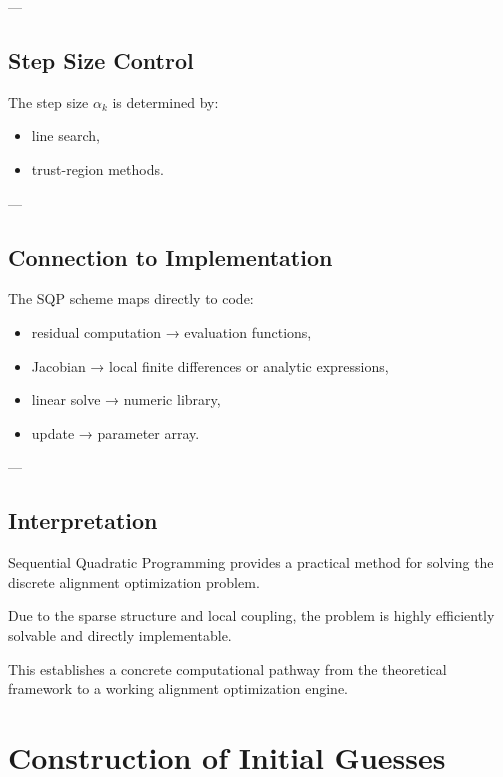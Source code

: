 ---

\subsection{Step Size Control}

\begin{remark}
The step size \(\alpha_k\) is determined by:
\begin{itemize}
\item line search,
\item trust-region methods.
\end{itemize}
\end{remark}

---

\subsection{Connection to Implementation}

\begin{remark}
The SQP scheme maps directly to code:
\begin{itemize}
\item residual computation → evaluation functions,
\item Jacobian → local finite differences or analytic expressions,
\item linear solve → numeric library,
\item update → parameter array.
\end{itemize}
\end{remark}

---

\subsection{Interpretation}

\begin{summary}
Sequential Quadratic Programming provides a practical method for solving
the discrete alignment optimization problem.

Due to the sparse structure and local coupling, the problem is highly
efficiently solvable and directly implementable.

This establishes a concrete computational pathway from the theoretical
framework to a working alignment optimization engine.
\end{summary}

\section{Construction of Initial Guesses}

